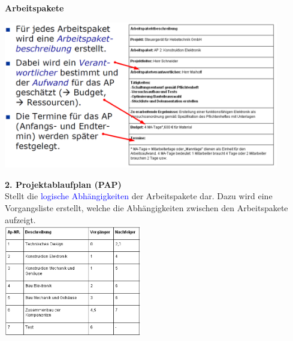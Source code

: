 \textbf{Arbeitspakete}\\
\begin{center}
\includegraphics[width = 12cm]{images/arbeitsbeschreibung}
\end{center}
\vspace{-0.5cm}
\begin{multicols}{2}
\textbf{2. Projektablaufplan (PAP)} \\
Stellt die \textcolor{blue}{logische Abhängigkeiten} der Arbeitspakete dar. Dazu wird eine Vorgangsliste erstellt, welche die Abhängigkeiten zwischen den Arbeitspakete aufzeigt. \\
\includegraphics[width = 6cm]{images/ablaufsplan}
\end{multicols}

